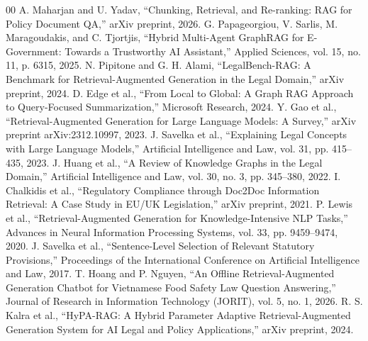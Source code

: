 \documentclass[conference]{IEEEtran}
\begin{document}
\begin{thebibliography}{00}
 A. Maharjan and U. Yadav, ``Chunking, Retrieval, and Re-ranking: RAG for Policy Document QA,'' arXiv preprint, 2026.
 G. Papageorgiou, V. Sarlis, M. Maragoudakis, and C. Tjortjis, ``Hybrid Multi-Agent GraphRAG for E-Government: Towards a Trustworthy AI Assistant,'' Applied Sciences, vol. 15, no. 11, p. 6315, 2025.
 N. Pipitone and G. H. Alami, ``LegalBench-RAG: A Benchmark for Retrieval-Augmented Generation in the Legal Domain,'' arXiv preprint, 2024.
 D. Edge et al., ``From Local to Global: A Graph RAG Approach to Query-Focused Summarization,'' Microsoft Research, 2024.
 Y. Gao et al., ``Retrieval-Augmented Generation for Large Language Models: A Survey,'' arXiv preprint arXiv:2312.10997, 2023.
 J. Savelka et al., ``Explaining Legal Concepts with Large Language Models,'' Artificial Intelligence and Law, vol. 31, pp. 415--435, 2023.
 J. Huang et al., ``A Review of Knowledge Graphs in the Legal Domain,'' Artificial Intelligence and Law, vol. 30, no. 3, pp. 345--380, 2022.
 I. Chalkidis et al., ``Regulatory Compliance through Doc2Doc Information Retrieval: A Case Study in EU/UK Legislation,'' arXiv preprint, 2021.
 P. Lewis et al., ``Retrieval-Augmented Generation for Knowledge-Intensive NLP Tasks,'' Advances in Neural Information Processing Systems, vol. 33, pp. 9459--9474, 2020.
 J. Savelka et al., ``Sentence-Level Selection of Relevant Statutory Provisions,'' Proceedings of the International Conference on Artificial Intelligence and Law, 2017.
 T. Hoang and P. Nguyen, ``An Offline Retrieval-Augmented Generation Chatbot for Vietnamese Food Safety Law Question Answering,'' Journal of Research in Information Technology (JORIT), vol. 5, no. 1, 2026.
 R. S. Kalra et al., ``HyPA-RAG: A Hybrid Parameter Adaptive Retrieval-Augmented Generation System for AI Legal and Policy Applications,'' arXiv preprint, 2024.
\end{thebibliography}
\end{document}
